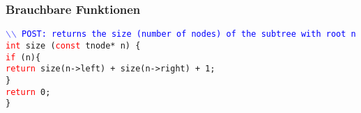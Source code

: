 \documentclass[a3paper, 10pt, landscape]{scrartcl}
\newcommand{\code}[1]{\texttt{#1}}
\begin{document}
\begin{multicols*}{3}
	\subsubsection{Brauchbare Funktionen}
	\code{\textcolor{blue}{$\backslash$$\backslash$ POST: returns the size (number of nodes) of the subtree with root n}\\
	\textcolor{red}{int} size (\textcolor{red}{const} tnode* n) \{ \\
	\phantom{int }\textcolor{red}{if} (n)\{\\
	\phantom{int if}\textcolor{red}{return} size(n->left) + size(n->right) + 1;\\
	\phantom{int }\}\\
	\phantom{int}\textcolor{red}{return} 0;\\
	\}
		}\\
	

\end{multicols*}
\end{document}
